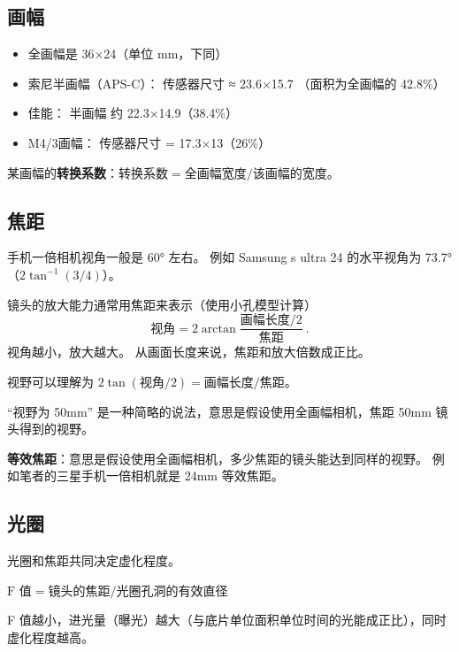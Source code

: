 
\subsection{画幅}
\begin{itemize}
\item 全画幅是 36×24（单位 mm，下同）
\item 索尼半画幅（APS-C）： 传感器尺寸 ≈ 23.6×15.7 （面积为全画幅的 42.8\%）
\item 佳能： 半画幅 约 22.3×14.9（38.4\%）
\item M4/3画幅： 传感器尺寸 = 17.3×13（26\%）
\end{itemize}

某画幅的\textbf{转换系数}：$\text{转换系数} = \text{全画幅宽度}/\text{该画幅的宽度}$。

\subsection{焦距}
手机一倍相机视角一般是 60° 左右。 例如 Samsung s ultra 24 的水平视角为 73.7°（$2\tan^{-1}(3/4)$）。

镜头的放大能力通常用焦距来表示（使用小孔模型计算）
\begin{equation}
\text{视角} = 2\arctan{\frac{\text{画幅长度/2}}{\text{焦距}}}~.
\end{equation}
视角越小，放大越大。 从画面长度来说，焦距和放大倍数成正比。

视野可以理解为 $2\tan(\text{视角}/2) = \text{画幅长度}/{\text{焦距}}$。

“视野为 50mm” 是一种简略的说法，意思是假设使用全画幅相机，焦距 50mm 镜头得到的视野。

\textbf{等效焦距}：意思是假设使用全画幅相机，多少焦距的镜头能达到同样的视野。 例如笔者的三星手机一倍相机就是 24mm 等效焦距。


\subsection{光圈}
光圈和焦距共同决定虚化程度。

$\text{F 值} = \text{镜头的焦距}/\text{光圈孔洞的有效直径}$

F 值越小，进光量（曝光）越大（与底片单位面积单位时间的光能成正比），同时虚化程度越高。
